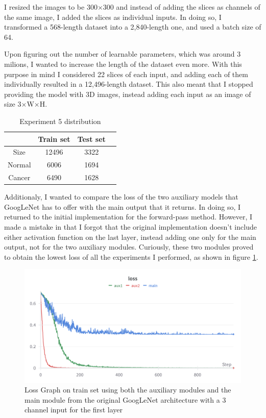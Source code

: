 I resized the images to be 300$\times$300 and instead of adding the slices as channels of the same image, I added the slices as individual inputs. In doing so, I transformed a 568-length dataset into a 2,840-length one, and used a batch size of 64.

Upon figuring out the number of learnable parameters, which was around 3 milions, I wanted to increase the length of the dataset even more. With this purpose in mind I considered 22 slices of each input, and adding each of them individually resulted in a 12,496-length dataset. This also meant that I stopped providing the model with 3D images, instead adding each input as an image of size 3$\times$W$\times$H.

\begin{table}[ht!]
\centering
\begin{tabular}{|c|c|c|c|}
    \hline
     & Train set & Test set \\ \hline
    Size & 12496 & 3322 \\ \hline
    Normal & 6006 & 1694\\ \hline
    Cancer & 6490 & 1628\\ \hline
    \end{tabular}
    \caption{Experiment 5 distribution}
    \label{tab:tab3}
\end{table}

Additionaly, I wanted to compare the loss of the two auxiliary models that GoogLeNet has to offer with the main output that it returns. In doing so, I returned to the initial implementation for the forward-pass method. However, I made a mistake in that I forgot that the original implementation doesn't include either activation function on the last layer, instead adding one only for the main output, not for the two auxiliary modules. Curiously, these two modules proved to obtain the lowest loss of all the experiments I performed, as shown in figure \ref{fig:fig18}.

\begin{figure}[H]
    \centering
    \includegraphics[width=0.75\linewidth]{figures/Figure19.png}
    \caption{Loss Graph on train set using both the auxiliary modules and the main module from the original GoogLeNet architecture with a 3 channel input for the first layer}
    \label{fig:fig18}
\end{figure}

